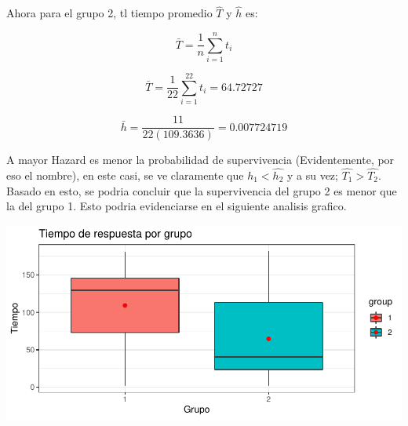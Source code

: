 \documentclass[
  12pt,
  letterpaper,
]{article}
\newenvironment{Shaded}{\begin{snugshade}}{\end{snugshade}}
\newcommand{\AttributeTok}[1]{\textcolor[rgb]{0.77,0.63,0.00}{#1}}
\newcommand{\DecValTok}[1]{\textcolor[rgb]{0.00,0.00,0.81}{#1}}
\newcommand{\FloatTok}[1]{\textcolor[rgb]{0.00,0.00,0.81}{#1}}
\newcommand{\FunctionTok}[1]{\textcolor[rgb]{0.00,0.00,0.00}{#1}}
\newcommand{\NormalTok}[1]{#1}
\newcommand{\OtherTok}[1]{\textcolor[rgb]{0.56,0.35,0.01}{#1}}
\newcommand{\SpecialCharTok}[1]{\textcolor[rgb]{0.00,0.00,0.00}{#1}}
\newcommand{\StringTok}[1]{\textcolor[rgb]{0.31,0.60,0.02}{#1}}
\begin{document}
Ahora para el grupo 2, tl tiempo promedio \(\hat{T}\) y \(\hat{h}\) es:

\[
\bar{T}=\frac{1}{n} \sum_{i=1}^n t_i
\]

\[
\bar{T}=\frac{1}{22} \sum_{i=1}^{22} t_i=64.72727
\]

\[
\bar{h}=\frac{11}{22(109.3636)}=0.007724719
\]

A mayor Hazard es menor la probabilidad de supervivencia (Evidentemente,
por eso el nombre), en este casi, se ve claramente que
\(\hat{h_1}<\hat{h_2}\) y a su vez; \(\hat{T_1}>\hat{T_2}\). Basado en
esto, se podria concluir que la supervivencia del grupo 2 es menor que
la del grupo 1. Esto podria evidenciarse en el siguiente analisis
grafico.

\begin{Shaded}
\end{Shaded}

\begin{center}\includegraphics{Trabajo-1-Supervivencia_files/figure-latex/unnamed-chunk-2-1} \end{center}
\end{document}
